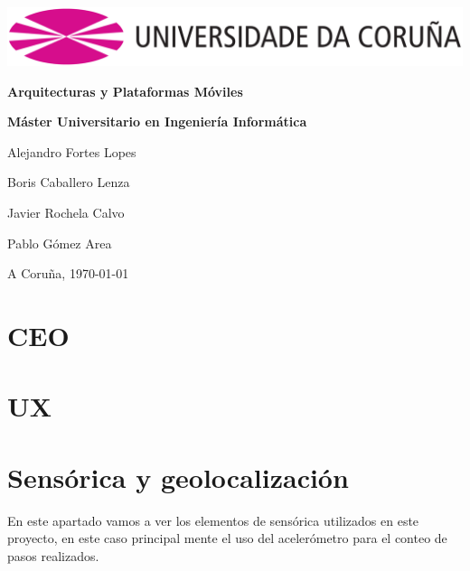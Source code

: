 \documentclass[12pt, a4paper, titlepage]{article}
\begin{document}
	\begin{titlepage}
	\includegraphics[width=15cm]{img/Simbolo_logo_UDC.png}
	\vspace{6cm}
		\begin{center}
			\Huge{\textbf{Arquitecturas y Plataformas Móviles}}

			\large{\textbf{Máster Universitario en Ingeniería Informática}}

		\end{center}
		\vspace{10cm}
		\begin{flushright}

			Alejandro Fortes Lopes

			Boris Caballero Lenza

			Javier Rochela Calvo

			Pablo Gómez Area

		\end{flushright}

		\vspace{1cm}
		\begin{flushright}
			A Coruña, \today
		\end{flushright}


	\end{titlepage}

	\clearpage

	\tableofcontents

	\clearpage

	\section{CEO}

	\clearpage

	\section{UX}

	\clearpage

    \section{Sensórica y geolocalización}
	En este apartado vamos a ver los elementos de sensórica utilizados en este proyecto, en este caso principal mente el uso del acelerómetro para el conteo de pasos realizados.
	\newline
\end{document}
